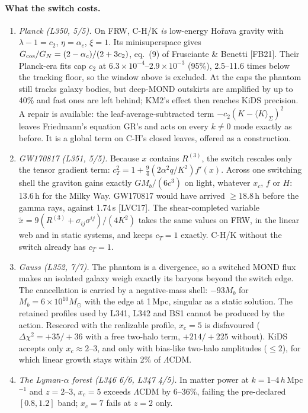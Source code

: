 \documentclass[10pt]{article}
\begin{document}
\paragraph{What the switch costs.}
\begin{enumerate}[label=(\alph*)]
\item \emph{Planck (L350, 5/5).} On FRW, C-H/K \emph{is} low-energy Ho\v{r}ava gravity with $\lambda-1=c_2$, $\eta=\alpha_c$, $\xi=1$. Its minisuperspace gives $G_{\rm cos}/G_N=(2-\alpha_c)/(2+3c_2)$, eq.~(9) of Frusciante \& Benetti [FB21]. Their Planck-era fits cap $c_2$ at $6.3\times10^{-4}$--$2.9\times10^{-3}$ (95\%), 2.5--11.6 times below the tracking floor, so the window above is excluded.
At the caps the phantom still tracks galaxy bodies, but deep-MOND outskirts are amplified by up to 40\% and fast ones are left behind; KM2's effect then reaches KiDS precision.
A repair is available: the leaf-average-subtracted term $-c_2(K-\langle K\rangle_\Sigma)^2$ leaves Friedmann's equation GR's and acts on every $k\neq0$ mode exactly as before. It is a global term on C-H's closed leaves, offered as a construction.
\item \emph{GW170817 (L351, 5/5).} Because $x$ contains $R^{(3)}$, the switch rescales only the tensor gradient term: $c_T^2=1+\tfrac94(2\alpha^2q/K^2)f'(x)$. Across one switching shell the graviton gains exactly $GM_b/(6c^3)$ on light, whatever $x_c$, $f$ or $H$: 13.6\,h for the Milky Way. GW170817 would have arrived $\geq18.8$\,h before the gamma rays, against 1.74\,s [LVC17].
The shear-completed variable $\tilde x=9(R^{(3)}+\sigma_{ij}\sigma^{ij})/(4K^2)$ takes the same values on FRW, in the linear web and in static systems, and keeps $c_T=1$ exactly. C-H/K without the switch already has $c_T=1$.
\item \emph{Gauss (L352, 7/7).} The phantom is a divergence, so a switched MOND flux makes an isolated galaxy weigh exactly its baryons beyond the switch edge. The cancellation is carried by a negative-mass shell: $-93M_b$ for $M_b=6\times10^{10}M_\odot$ with the edge at 1\,Mpc, singular as a static solution. The retained profiles used by L341, L342 and BS1 cannot be produced by the action.
Rescored with the realizable profile, $x_c=5$ is disfavoured ($\Delta\chi^2=+35/+36$ with a free two-halo term, $+214/+225$ without). KiDS accepts only $x_c\approx2$--$3$, and only with bias-like two-halo amplitudes ($\leq2$), for which linear growth stays within 2\% of $\Lambda$CDM.
\item \emph{The Lyman-$\alpha$ forest (L346 6/6, L347 4/5).} In matter power at $k=1$--$4\,h$\,Mpc$^{-1}$ and $z=2$--3, $x_c=5$ exceeds $\Lambda$CDM by 6--36\%, failing the pre-declared $[0.8,1.2]$ band; $x_c=7$ fails at $z=2$ only.

\end{enumerate}
\end{document}
